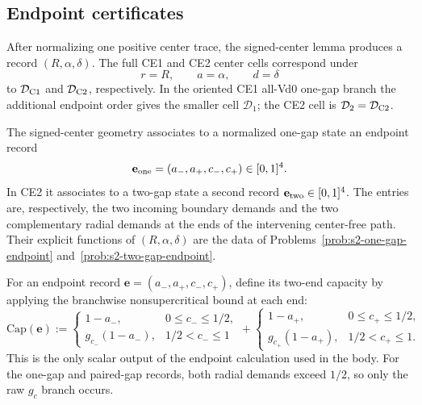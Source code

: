 \subsection{Endpoint certificates}

\begin{definition}
\label{def:body-strategy2-signed-domains}
After normalizing one positive center trace, the signed-center lemma produces
a record \((R,\alpha,\delta)\).  The full CE1 and CE2 center cells correspond
under
\[
 r=R,\qquad a=\alpha,\qquad d=\delta
\]
to \(\mathcal D_{\rm C1}\) and \(\mathcal D_{\rm C2}\), respectively.  In
the oriented CE1 all-Vd0 one-gap branch the additional endpoint order gives
the smaller cell \(\mathcal D_1\); the CE2 cell is
\(\mathcal D_2=\mathcal D_{\rm C2}\).
\end{definition}

\begin{definition}
\label{def:body-gap-endpoint-data}
The signed-center geometry associates to a normalized one-gap state an
endpoint record
\[
 \mathbf e_{\rm one}=(a_-,a_+,c_-,c_+)\in[0,1]^4.
\]
In CE2 it associates to a two-gap state a second record
$\mathbf e_{\rm two}\in[0,1]^4$.  The entries are, respectively, the two
incoming boundary demands and the two complementary radial demands at the
ends of the intervening center-free path.  Their explicit functions of
$(R,\alpha,\delta)$ are the data of Problems~\ref{prob:s2-one-gap-endpoint} and~\ref{prob:s2-two-gap-endpoint}.
\end{definition}

For an endpoint record
$\mathbf e=(a_-,a_+,c_-,c_+)$, define its two-end capacity by applying the
branchwise nonsupercritical bound at each end:
\[
 \mathrm{Cap}(\mathbf e)
 :=
 \begin{cases}
  1-a_-,&0\le c_-\le1/2,\\
  g_{c_-}(1-a_-),&1/2<c_-\le1
 \end{cases}
 +
 \begin{cases}
  1-a_+,&0\le c_+\le1/2,\\
  g_{c_+}(1-a_+),&1/2<c_+\le1.
 \end{cases}
\]
This is the only scalar output of the endpoint calculation used in the body.
For the one-gap and paired-gap records, both radial demands exceed $1/2$, so
only the raw $g_c$ branch occurs.

